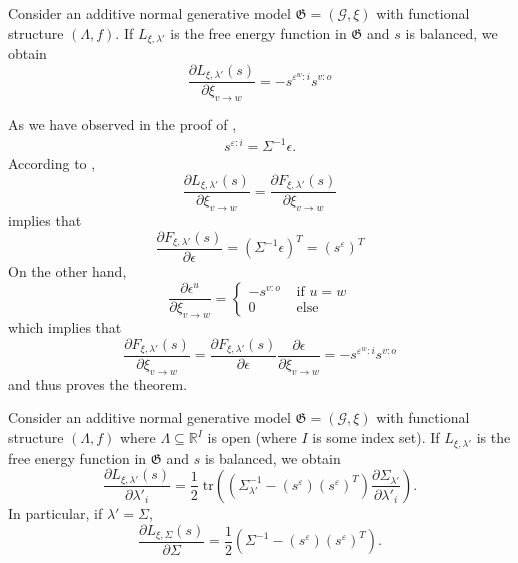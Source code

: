 \documentclass[a4paper,11pt]{report}
\newcommand{\tr}{\;\text{tr}}
\begin{document}
\begin{The}[Learning $\xi$]\label{learning-xi}
Consider an additive normal generative model $\mathfrak{G}=(\mathcal{G},\xi)$ with functional structure $(\Lambda,f)$. If $L_{\xi,\lambda'}$ is the free energy function in $\mathfrak{G}$ and $s$ is balanced, we obtain
\[
\frac{\partial L_{\xi,\lambda'}(s)}{\partial\xi_{v\to w}}=-s^{\varepsilon^w:i}s^{v:o}
\]
\end{The}

\begin{Bew}
As we have observed in the proof of , 
\begin{align*}
s^{\varepsilon:i}=\Sigma^{-1}\epsilon.
\end{align*}
According to ,
\[
\frac{\partial L_{\xi,\lambda'}(s)}{\partial\xi_{v\to w}}=\frac{\partial F_{\xi,\lambda'}(s)}{\partial\xi_{v\to w}}
\]
 implies that
\[
\frac{\partial F_{\xi,\lambda'}(s)}{\partial\epsilon}=(\Sigma^{-1}\epsilon)^T=\left(s^{\varepsilon}\right)^T
\]
On the other hand,
\[
\frac{\partial\epsilon^u}{\partial \xi_{v\to w}}=\begin{cases}
-s^{v:o}&\text{ if }u=w\\
0 &\text{ else}
\end{cases}
\]
which implies that
\[
\frac{\partial F_{\xi,\lambda'}(s)}{\partial\xi_{v\to w}}=
\frac{\partial F_{\xi,\lambda'}(s)}{\partial\epsilon}
\frac{\partial\epsilon}{\partial\xi_{v\to w}}=
-s^{\varepsilon^w:i}s^{v:o}
\]
and thus proves the theorem.
\end{Bew}

\begin{The}\label{learning-lambda}
Consider an additive normal generative model $\mathfrak{G}=(\mathcal{G},\xi)$ with functional structure $(\Lambda,f)$ where $\Lambda\subseteq\mathbb{R}^I$ is open (where $I$ is some index set). If $L_{\xi,\lambda'}$ is the free energy function in $\mathfrak{G}$ and $s$ is balanced, we obtain
\begin{equation}\label{eq:learning-lambda}
\frac{\partial L_{\xi,\lambda'}(s)}{\partial\lambda'_i}=
\frac12\tr\left(\left(\Sigma_{\lambda'}^{-1}-\left(s^{\varepsilon}\right)\left(s^{\varepsilon}\right)^T\right)\frac{\partial\Sigma_{\lambda'}}{\partial\lambda'_i}\right).
\end{equation}
In particular, if $\lambda'=\Sigma$, 
\begin{equation}\label{eq:learning-sigma}
\frac{\partial L_{\xi,\Sigma}(s)}{\partial\Sigma}=
\frac12\left(\Sigma^{-1}-\left(s^{\varepsilon}\right)\left(s^{\varepsilon}\right)^T\right)
.
\end{equation}
\end{The}
\end{document}
